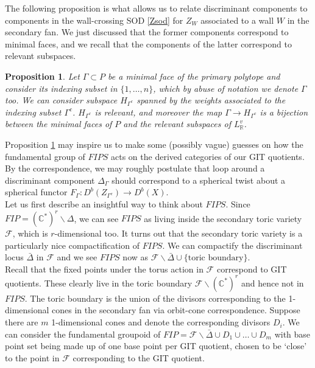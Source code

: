 \documentclass[oneside,reqno]{amsart}
\newtheorem{prop}{Proposition} [section]
\theoremstyle{definition}
\theoremstyle{definition}
\theoremstyle{definition}
\theoremstyle{definition}
\newcommand{\CC}{\mathbb{C}}
\newcommand{\Fs}{\mathcal{F}}
\begin{document}
The following proposition is what allows us to relate discriminant components to components in the wall-crossing SOD \eqref{Zsod} for $Z_W$ associated to a wall $W$ in the secondary fan. We just discussed that the former components correspond to minimal faces, and we recall that the components of the latter correspond to relevant subspaces.
\begin{prop}
    \label{faces&subspaces}
    Let $\Gamma \subset P$ be a minimal face of the primary polytope and consider its indexing subset in $\{1,\dots,n \}$, which by abuse of notation we denote $\Gamma$ too. We can consider subspace $H_{\Gamma^c}$ spanned by the weights associated to the indexing subset $\Gamma^c$. $H_{\Gamma^c}$ is relevant, and moreover the map $\Gamma \to H_{\Gamma^c}$ is a bijection between the minimal faces of $P$ and the relevant subspaces of $L_{\mathbb{R}}^v$.
\end{prop}
\noindent
Proposition \ref{faces&subspaces} may inspire us to make some (possibly vague) guesses on how the fundamental group of $FIPS$ acts on the derived categories of our GIT quotients. By the correspondence, we may roughly postulate that loop around a discriminant component $\Delta_\Gamma$ should correspond to a spherical twist about a spherical functor $F_{\Gamma} : D^b(Z_{\Gamma^c}) \to D^b(X)$. \\
\newline
Let us first describe an insightful way to think about $FIPS$. Since $FIP=(\CC^*)^r \backslash \Delta $, we can see $FIPS$ as living inside the secondary toric variety $\Fs$, which is $r$-dimensional too. It turns out that the secondary toric variety is a particularly nice compactification of $FIPS$. We can compactify the discriminant locus $\bar{\Delta} $ in $\Fs$ and we see $FIPS$ now as $\Fs \backslash \bar{\Delta} \cup \{\text{toric boundary} \}$. \\
\newline
Recall that the fixed points under the torus action in $\Fs$ correspond to GIT quotients. These clearly live in the toric boundary $\Fs \backslash (\CC^*)^r$ and hence not in $FIPS$. The toric boundary is the union of the divisors corresponding to the 1-dimensional cones in the secondary fan via orbit-cone correspondence. Suppose there are $m$ 1-dimensional cones and denote the corresponding divisors $D_i$. We can consider the fundamental groupoid of $FIP= \Fs \backslash \bar{\Delta} \cup D_1 \cup \dots \cup D_m$ with base point set being made up of one base point per GIT quotient, chosen to be `close' to the point in $\Fs$ corresponding to the GIT quotient. 
\end{document}

